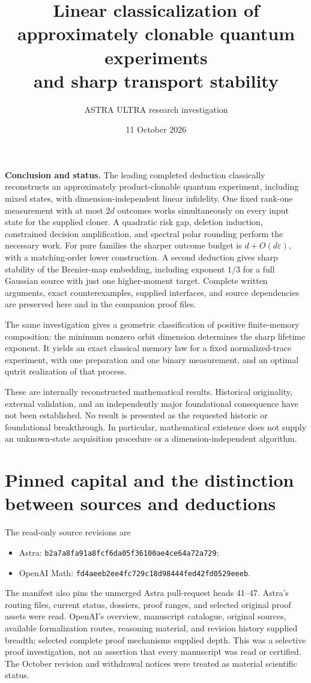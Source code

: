\documentclass[11pt]{article}
\title{Linear classicalization of approximately clonable quantum experiments\\and sharp transport stability}
\author{ASTRA ULTRA research investigation}
\date{11 October 2026}
\begin{document}
\maketitle

\noindent\textbf{Conclusion and status.}
The leading completed deduction classically reconstructs an approximately product-clonable quantum experiment, including mixed states, with dimension-independent linear infidelity. One fixed rank-one measurement with at most $2d$ outcomes works simultaneously on every input state for the supplied cloner. A quadratic risk gap, deletion induction, constrained decision amplification, and spectral polar rounding perform the necessary work. For pure families the sharper outcome budget is $d+O(d\varepsilon)$, with a matching-order lower construction. A second deduction gives sharp stability of the Brenier-map embedding, including exponent $1/3$ for a full Gaussian source with just one higher-moment target. Complete written arguments, exact counterexamples, supplied interfaces, and source dependencies are preserved here and in the companion proof files.

The same investigation gives a geometric classification of positive finite-memory composition: the minimum nonzero orbit dimension determines the sharp lifetime exponent. It yields an exact classical memory law for a fixed normalized-trace experiment, with one preparation and one binary measurement, and an optimal qutrit realization of that process.

These are internally reconstructed mathematical results. Historical originality, external validation, and an independently major foundational consequence have not been established. No result is presented as the requested historic or foundational breakthrough. In particular, mathematical existence does not supply an unknown-state acquisition procedure or a dimension-independent algorithm.

\tableofcontents

\section{Pinned capital and the distinction between sources and deductions}

The read-only source revisions are
\begin{itemize}
\item Astra: \texttt{b2a7a8fa91a8fcf6da05f36100ae4ce64a72a729};
\item OpenAI Math: \texttt{fd4aeeb2ee4fc729c18d98444fed42fd0529eeeb}.
\end{itemize}
The manifest also pins the unmerged Astra pull-request heads 41--47. Astra's routing files, current status, dossiers, proof ranges, and selected original proof assets were read. OpenAI's overview, manuscript catalogue, original sources, available formalization routes, reasoning material, and revision history supplied breadth; selected complete proof mechanisms supplied depth. This was a selective proof investigation, not an assertion that every manuscript was read or certified. The October revision and withdrawal notices were treated as material scientific status.
\end{document}
